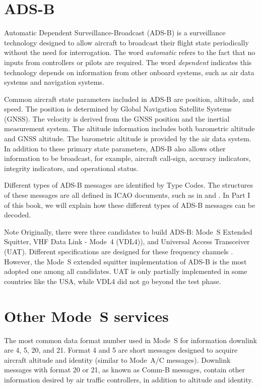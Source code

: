 \section{ADS-B}

Automatic Dependent Surveillance-Broadcast (ADS-B) is a surveillance technology designed to allow aircraft to broadcast their flight state periodically without the need for interrogation. The word \emph{automatic} refers to the fact that no inputs from controllers or pilots are required. The word \emph{dependent} indicates this technology depends on information from other onboard systems, such as air data systems and navigation systems.

Common aircraft state parameters included in ADS-B are position, altitude, and speed. The position is determined by Global Navigation Satellite Systems (GNSS). The velocity is derived from the GNSS position and the inertial measurement system. The altitude information includes both barometric altitude and GNSS altitude. The barometric altitude is provided by the air data system. In addition to these primary state parameters, ADS-B also allows other information to be broadcast, for example, aircraft call-sign, accuracy indicators, integrity indicators, and operational status.

Different types of ADS-B messages are identified by Type Codes. The structures of these messages are all defined in ICAO documents, such as in \cite{icao9871v1} and \cite{rtca2011mops}. In Part I of this book, we will explain how these different types of ADS-B messages can be decoded.

\begin{notebox}{Note}
Originally, there were three candidates to build ADS-B: Mode~S Extended Squitter, VHF Data Link - Mode~4 (VDL4)), and Universal Access Transceiver (UAT). Different specifications are designed for these frequency channels \cite{rtca2011mops, rtca2002uat}. However, the Mode~S extended squitter implementation of ADS-B is the most adopted one among all candidates. UAT is only partially implemented in some countries like the USA, while VDL4 did not go beyond the test phase.
\end{notebox}


\section{Other Mode~S services}

The most common data format number used in Mode~S for information downlink are 4, 5, 20, and 21. Format 4 and 5 are short messages designed to acquire aircraft altitude and identity (similar to Mode~A/C messages). Downlink messages with format 20 or 21, as known as Comm-B messages, contain other information desired by air traffic controllers, in addition to altitude and identity.


